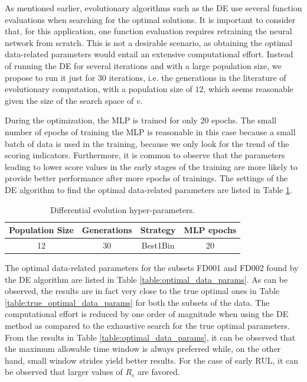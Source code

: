 \documentclass[preprint,12pt]{elsarticle}%
\begin{document}
As mentioned earlier, evolutionary algorithms such as the DE use several
function evaluations when searching for the optimal solutions. It is important to consider that, for
this application, one function evaluation requires retraining the neural
network from scratch. This is not a desirable scenario, as obtaining the
optimal data-related parameters would entail an extensive computational
effort. Instead of running the DE for several iterations and with a large
population size, we propose to run it just for $30$ iterations, i.e. the
generations in the literature of evolutionary computation, with a population
size of $12$, which seems reasonable given the size of the search space of $v$.

During the optimization, the MLP is trained for only $20$ epochs. The small number
of epochs of training the MLP is reasonable in this case because a small batch
of data is used in the training, because we only look for the trend of the scoring indicators.
Furthermore, it is common to observe that the parameters leading to lower
score values in the early stages of the training are more likely to provide
better performance after more epochs of trainings. The settings of
the DE algorithm to find the optimal data-related parameters are listed in
Table \ref{table:de_hyperparams}.

\begin{table}[!htb]
\begin{center}
\begin{tabular}[c]{llll}\hline
Population Size & Generations & Strategy & MLP epochs\\\hline
\multicolumn{1}{c}{12} & \multicolumn{1}{c}{30} & \multicolumn{1}{c}{Best1Bin \cite{Engelbrecht2007}}
& \multicolumn{1}{c}{20}\\\hline
\end{tabular}
\caption{Differential evolution hyper-parameters.}
\label{table:de_hyperparams}
\end{center}
\end{table}

The optimal data-related parameters for the subsets FD001 and FD002 found by
the DE algorithm are listed in Table \ref{table:optimal_data_params}. As can be
observed, the results are in fact very close to the true optimal ones 
in Table \ref{table:true_optimal_data_params} for both the subsets of the
data. The computational effort is reduced by one order of magnitude when using
the DE method as compared to the exhaustive search for the true optimal
parameters. From the results in Table \ref{table:optimal_data_params}, it can
be observed that the maximum allowable time window is always preferred while,
on the other hand, small window strides yield better results. For the case of
early RUL, it can be observed that larger values of $R_{e}$ are favored.
\end{document}
